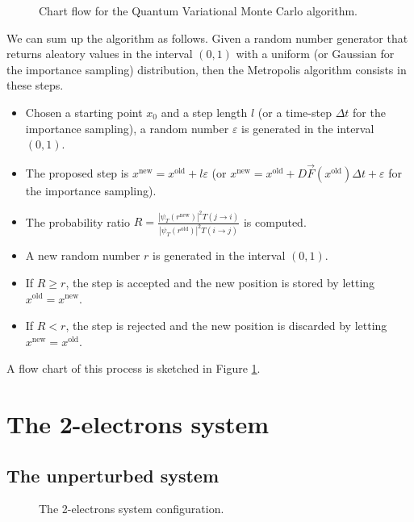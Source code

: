 \documentclass[a4paper,twoside,11pt]{book}
\begin{document}
\begin{figure}[H]
\begin{tikzpicture}[node distance=2cm]
	\end{tikzpicture}
	\caption{Chart flow for the Quantum Variational Monte Carlo algorithm.}
	\label{fig:chart_flow}
\end{figure}

We can sum up the algorithm as follows. Given a random number generator that returns aleatory values in the interval $(0, 1)$ with a uniform (or Gaussian for the importance sampling) distribution, then the Metropolis algorithm consists in these steps.
\begin{itemize}
	\item Chosen a starting point $x_0$ and a step length $l$ (or a time-step $\Delta t$ for the importance sampling), a random number $\varepsilon$ is generated in the interval $(0, 1)$.
	\item The proposed step is $x^{\text{new}}=x^{\text{old}} + l\varepsilon$ (or $x^{\text{new}} = x^{\text{old}} + D\vec{F}(x^{\text{old}})\Delta t + \varepsilon$ for the importance sampling).
	\item The probability ratio $R = \frac{|\psi_T(r^{\text{new}})|^2T(j \rightarrow i)}{|\psi_T(r^{\text{old}})|^2T(i \rightarrow j)}$ is computed.
	\item A new random number $r$ is generated in the interval $(0, 1)$.
	\item If $R \geq r$, the step is accepted and the new position is stored by letting $x^{\text{old}}=x^{\text{new}}$.
	\item If $R < r$, the step is rejected and the new position is discarded by letting $x^{\text{new}}=x^{\text{old}}$.
\end{itemize}
A flow chart of this process is sketched in Figure \ref{fig:chart_flow}.



\chapter{The 2-electrons system}

\section{The unperturbed system}
\label{sec:2e_unp}

\begin{figure}[H]
	\centering
	\caption{The 2-electrons system configuration.}
	\label{eq:sketch_2e}
\end{figure}
\end{document}

